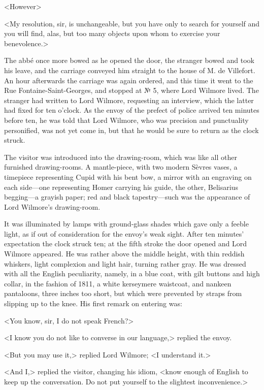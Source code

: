  <However\longdash> 

 <My resolution, sir, is unchangeable, but you have only to search for yourself and you will find, alas, but too many objects upon whom to exercise your benevolence.> 

 The abbé once more bowed as he opened the door, the stranger bowed and took his leave, and the carriage conveyed him straight to the house of M. de Villefort. An hour afterwards the carriage was again ordered, and this time it went to the Rue Fontaine-Saint-Georges, and stopped at № 5, where Lord Wilmore lived. The stranger had written to Lord Wilmore, requesting an interview, which the latter had fixed for ten o'clock. As the envoy of the prefect of police arrived ten minutes before ten, he was told that Lord Wilmore, who was precision and punctuality personified, was not yet come in, but that he would be sure to return as the clock struck. 

 The visitor was introduced into the drawing-room, which was like all other furnished drawing-rooms. A mantle-piece, with two modern Sèvres vases, a timepiece representing Cupid with his bent bow, a mirror with an engraving on each side—one representing Homer carrying his guide, the other, Belisarius begging—a grayish paper; red and black tapestry—such was the appearance of Lord Wilmore's drawing-room. 

 It was illuminated by lamps with ground-glass shades which gave only a feeble light, as if out of consideration for the envoy's weak sight. After ten minutes' expectation the clock struck ten; at the fifth stroke the door opened and Lord Wilmore appeared. He was rather above the middle height, with thin reddish whiskers, light complexion and light hair, turning rather gray. He was dressed with all the English peculiarity, namely, in a blue coat, with gilt buttons and high collar, in the fashion of 1811, a white kerseymere waistcoat, and nankeen pantaloons, three inches too short, but which were prevented by straps from slipping up to the knee. His first remark on entering was: 

 <You know, sir, I do not speak French?> 

 <I know you do not like to converse in our language,> replied the envoy. 

 <But you may use it,> replied Lord Wilmore; <I understand it.> 

 <And I,> replied the visitor, changing his idiom, <know enough of English to keep up the conversation. Do not put yourself to the slightest inconvenience.> 

